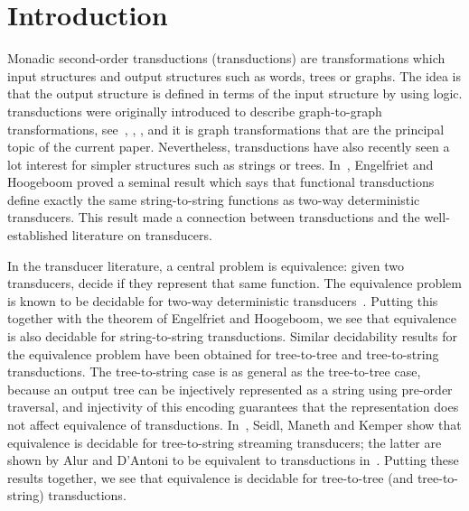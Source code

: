 \section{Introduction}
Monadic second-order transductions (\mso transductions) are transformations which input structures  and output  structures such as words, trees or graphs. The idea is that the output structure is defined in terms of the input structure by using \mso logic. \mso transductions were originally introduced to describe graph-to-graph transformations, see~\cite[p.~43]{arnborgLagergrenSeese1988}, \cite[Definition 6]{engelfriet1991}, \cite[Defintion 2.2]{courcelle1991}, and it is graph transformations that are the principal topic of the current paper. Nevertheless, \mso transductions have also recently seen a lot interest for simpler structures such as strings or trees. In~\cite[Theorem 13]{engelfrietMSODefinableString2001},  Engelfriet and Hoogeboom proved a seminal result which says  that functional \mso transductions  define exactly the same string-to-string functions as two-way deterministic transducers. This result made a connection between \mso transductions and the well-established literature on transducers. 

In the transducer literature, a central problem is equivalence: given two transducers, decide if they represent that same function. The equivalence  problem  is known to be decidable for two-way deterministic transducers~\cite[Theorem 1]{gurariEquivalenceProblemDeterministic1982}. Putting this together with the theorem of Engelfriet and Hoogeboom, we see that  equivalence is also decidable for string-to-string \mso transductions.
Similar decidability results for the equivalence problem have been obtained  for tree-to-tree and tree-to-string transductions.  The tree-to-string case is as general as the tree-to-tree case, because an output tree can be  injectively represented as a string using pre-order traversal, and injectivity of this encoding guarantees that the representation does not affect equivalence of transductions. In~\cite[Corollary 8.2]{seidlManethKemper2018}, Seidl, Maneth and Kemper show that equivalence is decidable for tree-to-string streaming transducers; the latter are shown by Alur and D'Antoni to be equivalent to \mso transductions in~\cite[Theorem 4.6]{alurStreamingTreeTransducers2017}. Putting these results together, we see that equivalence is decidable for tree-to-tree (and tree-to-string) \mso transductions.

